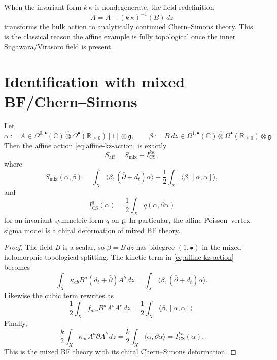 \begin{remark}
When the invariant form $k\,\kappa$ is nondegenerate, the field redefinition
\[
\widetilde A = A + (k\,\kappa)^{-1}(B)\,dz
\]
transforms the bulk action to analytically continued Chern--Simons theory.
This is the classical reason the affine example is fully topological once the inner Sugawara/Virasoro
field is present.
\end{remark}

\section{Identification with mixed BF/Chern--Simons}

\begin{proposition}\label{prop:affine-mixed-bf-dictionary}
Let
\[
\alpha := A \in \Omega^{0,\bullet}(\mathbb C)\widehat\otimes \Omega^{\bullet}(\mathbb R_{\ge 0})[1] \otimes \mathfrak g,
\qquad
\beta := B\,dz \in \Omega^{1,\bullet}(\mathbb C)\widehat\otimes \Omega^{\bullet}(\mathbb R_{\ge 0}) \otimes \mathfrak g.
\]
Then the affine action \eqref{eq:affine-kz-action} is exactly
\begin{equation}
\label{eq:smix-plus-ics}
S_{\mathrm{aff}} = S_{\mathrm{mix}} + I_{\mathrm{CS}}^{k\kappa},
\end{equation}
where
\begin{equation}
\label{eq:smix-def}
S_{\mathrm{mix}}(\alpha,\beta)
=
\int_X \langle \beta,(\bar\partial+d_t)\alpha\rangle
+ \frac{1}{2}\int_X \langle \beta,[\alpha,\alpha]\rangle,
\end{equation}
and
\begin{equation}
\label{eq:ics-def}
I_{\mathrm{CS}}^{q}(\alpha)
=
\frac{1}{2}\int_X q(\alpha,\partial\alpha)
\end{equation}
for an invariant symmetric form $q$ on $\mathfrak g$.
In particular, the affine Poisson--vertex sigma model is a chiral deformation of mixed BF theory.
\end{proposition}

\begin{proof}
The field $B$ is a scalar, so $\beta = B\,dz$ has bidegree $(1,\bullet)$ in the mixed holomorphic-topological
splitting. The kinetic term in \eqref{eq:affine-kz-action} becomes
\[
\int_X \kappa_{ab} B^a (d_t+\bar\partial)A^b\,dz
=
\int_X \langle \beta,(\bar\partial+d_t)\alpha\rangle.
\]
Likewise the cubic term rewrites as
\[
\frac{1}{2}\int_X f_{abc} B^a A^b A^c\,dz
=
\frac{1}{2}\int_X \langle \beta,[\alpha,\alpha]\rangle.
\]
Finally,
\[
\frac{k}{2}\int_X \kappa_{ab} A^a \partial A^b\,dz
=
\frac{k}{2}\int_X \langle \alpha,\partial\alpha\rangle
=
 I_{\mathrm{CS}}^{k\kappa}(\alpha).
\]
This is the mixed BF theory with its chiral Chern--Simons deformation.
\end{proof}


